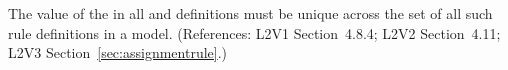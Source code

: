 The value of the   in all \AssignmentRule and
\RateRule definitions must be unique across the set of all such rule
definitions in a model.  (References: L2V1 Section~4.8.4; 
L2V2 Section~4.11; L2V3 Section~\ref{sec:assignmentrule}.)
